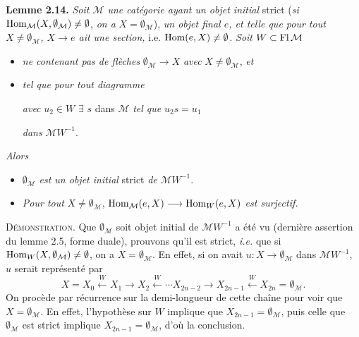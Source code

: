 \textbf{Lemme 2.14.} \textit{Soit $\mathcal{M}$ une catégorie ayant un objet initial} strict (\textit{si} $\operatorname{Hom}_{\mathcal{M}}(X,\emptyset_{\mathcal{M}})\neq\emptyset$, \textit{on a} $X=\emptyset_{\mathcal{M}}$), \textit{un objet final $e$, et telle que pour tout $X\neq\emptyset_{\mathcal{M}}$, $X\longrightarrow e$ ait une section,} i.e. $\operatorname{Hom}(e,X)\neq\emptyset$. \textit{Soit} $W\subset\operatorname{Fl}\mathcal{M}$
\begin{itemize}[leftmargin=3em,labelwidth=2.5em,align=right]
\item[1$^{\circ}$)] \textit{ne contenant pas de flèches} $\emptyset_{\mathcal{M}}\longrightarrow X$ \textit{avec} $X\neq\emptyset_{\mathcal{M}}$, \textit{et}
\item[2\,$^{\circ}$)] \textit{tel que pour tout diagramme}
\textit{avec} $u_2\in W$ $\exists$ $s$ dans $\mathcal{M}$ \textit{tel que} $u_2s=u_1$

\textit{dans} $\mathcal{M}W^{-1}$.
\end{itemize}
\textit{Alors}
\begin{itemize}[leftmargin=3em,labelwidth=2.5em,align=right]
\item[a)] $\emptyset_{\mathcal{M}}$ \textit{est un objet initial} strict \textit{de} $\mathcal{M}W^{-1}$.
\item[b)] \textit{Pour tout} $X\neq\emptyset_{\mathcal{M}}$, $\operatorname{Hom}_{\mathcal{M}}(e,X)\longrightarrow\operatorname{Hom}_W(e,X)$ \textit{est surjectif.}
\end{itemize}

\textsc{Démonstration}. Que $\emptyset_{\mathcal{M}}$ soit objet initial de $\mathcal{M}W^{-1}$ a été vu (dernière assertion du lemme 2.5, forme duale), prouvons qu'il est strict, \textit{i.e.} que si $\operatorname{Hom}_W(X,\emptyset_{\mathcal{M}})\neq\emptyset$, on a $X=\emptyset_{\mathcal{M}}$. En effet, si on avait $u : X\longrightarrow\emptyset_{\mathcal{M}}$ dans $\mathcal{M}W^{-1}$, $u$ serait représenté par
\[
X=X_0\xleftarrow{\ W\ }X_1\longrightarrow X_2\xleftarrow{\ W\ }\cdots X_{2n-2}\longrightarrow X_{2n-1}\xleftarrow{\ W\ }X_{2n}=\emptyset_{\mathcal{M}}.
\]
On procède par récurrence sur la demi-longueur de cette chaîne pour voir que $X=\emptyset_{\mathcal{M}}$. En effet, l'hypothèse sur $W$ implique que $X_{2n-1}=\emptyset_{\mathcal{M}}$, puis celle que $\emptyset_{\mathcal{M}}$ est strict implique
$X_{2n-1}=\emptyset_{\mathcal{M}}$, d'où la conclusion. %

